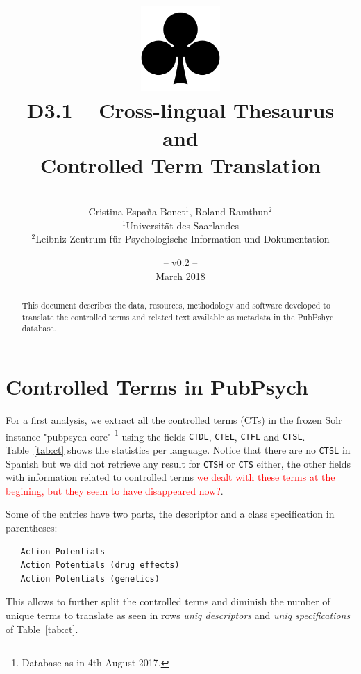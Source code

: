 \documentclass[a4paper,11pt]{article}
\title{
\includegraphics[width=3cm]{./img/200px-SuitClubs.png} \\
\Huge D3.1 -- Cross-lingual Thesaurus and \\ Controlled Term Translation \\ 
}
\author{\vspace*{1cm}\\ \LARGE Cristina Espa\~na-Bonet$^{1}$, Roland Ramthun$^{2}$ \medskip \\ 
                        \Large $^{1}$Universit\"at des Saarlandes\\ \Large $^{2}$Leibniz-Zentrum für Psychologische Information und Dokumentation}
\date{\vspace*{2cm} -- v0.2 --\\March 2018}
\newcommand{\red}[1]{\textcolor{red}{#1}}
\begin{document}
\clearpage\maketitle
\thispagestyle{empty}

\vspace*{5cm}
\begin{abstract}
This document describes the data, resources, methodology and software developed to translate the controlled terms and related text available as metadata in the PubPshyc database.
\end{abstract}

\newpage
\tableofcontents
\clearpage



\section{Controlled Terms in PubPsych}
\label{s:ct}

For a first analysis, we extract all the controlled terms (CTs) in the frozen Solr instance "pubpsych-core"%
\footnote{Database as in 4th August 2017.}  using the fields {\tt CTDL}, {\tt CTEL}, {\tt CTFL} and {\tt CTSL}. Table~\ref{tab:ct} shows the statistics per language. Notice that there are no {\tt CTSL} in Spanish but we did not retrieve any result for {\tt CTSH} or {\tt CTS} either, the other fields with information related to controlled terms \red{we dealt with these terms at the begining, but they seem to have disappeared now?}.

Some of the entries have two parts, the descriptor and a class specification in parentheses:
{\small 
\begin{verbatim}
   Action Potentials
   Action Potentials (drug effects)
   Action Potentials (genetics)
\end{verbatim}
}

This allows to further split the controlled terms and diminish the number of unique terms to translate as seen in rows \emph{uniq descriptors} and \emph{uniq specifications} of Table~\ref{tab:ct}.
\end{document}
